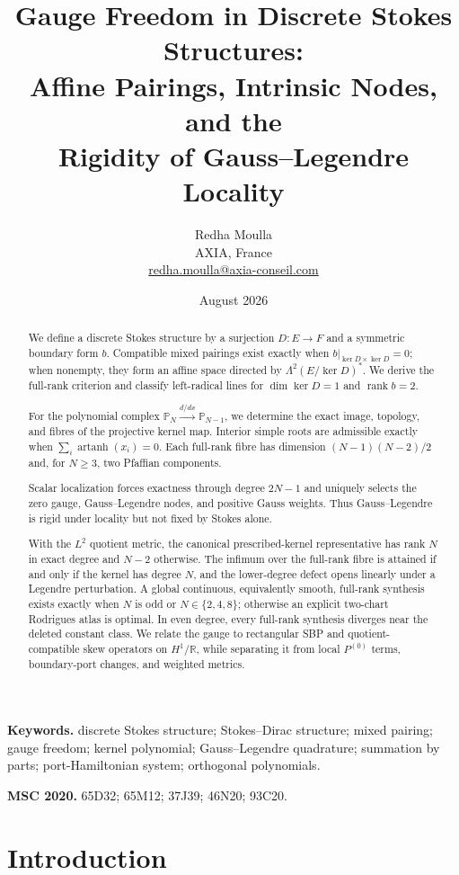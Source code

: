 \documentclass[11pt,a4paper]{article}
\title{\bfseries Gauge Freedom in Discrete Stokes Structures:\\
Affine Pairings, Intrinsic Nodes, and the\\
Rigidity of Gauss--Legendre Locality}
\author{Redha Moulla\\
\small AXIA, France\\
\small \href{mailto:redha.moulla@axia-conseil.com}{redha.moulla@axia-conseil.com}}
\date{August 2026}
\theoremstyle{definition}
\theoremstyle{remark}
\newcommand{\R}{\mathbb{R}}
\newcommand{\Pp}{\mathbb{P}}
\newcommand{\Ker}{\operatorname{ker}}
\newcommand{\rank}{\operatorname{rank}}
\begin{document}
\maketitle

\begin{abstract}
We define a discrete Stokes structure by a surjection $D:E\to F$ and a symmetric boundary
form $b$.  Compatible mixed pairings exist exactly when
$b|_{\Ker D\times\Ker D}=0$; when nonempty, they form an affine space directed by
$\Lambda^2(E/\Ker D)^*$.  We derive the full-rank criterion and classify left-radical
lines for $\dim\Ker D=1$ and $\rank b=2$.

For the polynomial complex $\Pp_N\xrightarrow{d/dx}\Pp_{N-1}$, we determine the exact image,
topology, and fibres of the projective kernel map.  Interior simple roots are admissible
exactly when $\sum_i\operatorname{artanh}(x_i)=0$.  Each full-rank fibre has dimension
$(N-1)(N-2)/2$ and, for $N\geq3$, two Pfaffian components.

Scalar localization forces exactness through degree $2N-1$ and uniquely selects the zero
gauge, Gauss--Legendre nodes, and positive Gauss weights.
Thus Gauss--Legendre is rigid under locality but not fixed by Stokes alone.

With the $L^2$ quotient metric, the canonical prescribed-kernel representative has rank $N$
in exact degree and $N-2$ otherwise.  The infimum over the full-rank fibre is attained if and
only if the kernel has degree $N$, and the lower-degree defect opens linearly under a Legendre
perturbation.  A global continuous, equivalently smooth, full-rank synthesis exists exactly
when $N$ is odd or $N\in\{2,4,8\}$; otherwise an explicit two-chart Rodrigues atlas is optimal.
In even degree, every full-rank synthesis diverges near the deleted constant class.  We
relate the gauge to rectangular SBP and quotient-compatible skew operators on $H^1/\R$,
while separating it from local $P^{(0)}$ terms, boundary-port changes, and weighted metrics.
\end{abstract}

\noindent\textbf{Keywords.}
discrete Stokes structure; Stokes--Dirac structure; mixed pairing; gauge freedom; kernel polynomial; Gauss--Legendre
quadrature; summation by parts; port-Hamiltonian system; orthogonal polynomials.

\noindent\textbf{MSC 2020.}
65D32; 65M12; 37J39; 46N20; 93C20.

\section{Introduction}
\end{document}
